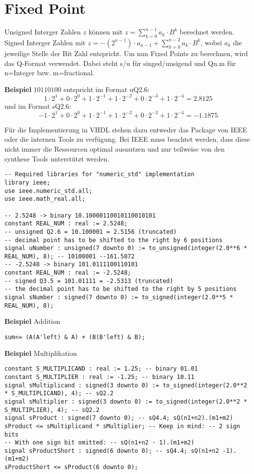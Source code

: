 \section{Fixed Point}
Unsigned Interger Zahlen $z$ können mit $z=\sum_{k=0}^{n-1}a_k\cdot B^k$ berechnet werden. Signed Interger Zahlen mit $z=-(2^{n-1})\cdot a_{n-1}+\sum_{k=0}^{n-2}a_k\cdot B^k$, wobei $a_k$ die jeweilige Stelle der Bit Zahl entspricht. Um nun Fixed Points zu berechnen, wird das Q-Format verwendet. Dabei steht s/u für singed/unsigend und Qn.m für n=Integer bzw. m=fractional.

\textbf{Beispiel} $10110100$ entspricht im Format uQ2.6:
\[
1\cdot 2^1 + 0\cdot2^0 + 1\cdot2^{-1}+ 1\cdot2^{-2}+ 0\cdot2^{-3}+ 1\cdot2^{-4} = 2.8125
\]
und im Format sQ2.6:
\[
-1\cdot 2^1 + 0\cdot2^0 + 1\cdot2^{-1}+ 1\cdot2^{-2}+ 0\cdot2^{-3}+ 1\cdot2^{-4} = -1.1875
\]

Für die Implementierung in VHDL stehen dazu entweder das Package von IEEE oder die internen Tools zu verfügung. Bei IEEE muss beachtet werden, dass diese nicht immer die Ressourcen optimal ausnutzen und nur teilweise von den synthese Tools unterstützt werden.

\begin{lstlisting}
-- Required libraries for "numeric_std" implementation
library ieee;
use ieee.numeric_std.all;
use ieee.math_real.all;

-- 2.5248 -> binary 10.10000110010110010101
constant REAL_NUM : real := 2.5248;
-- unsigned Q2.6 = 10.100001 = 2.5156 (truncated)
-- decimal point has to be shifted to the right by 6 positions
signal uNumber : unsigned(7 downto 0) := to_unsigned(integer(2.0**6 * REAL_NUM), 8); -- 10100001 --161.5872
-- -2.5248 -> binary 101.0111100110101
constant REAL_NUM : real := -2.5248;
-- signed Q3.5 = 101.01111 = -2.5313 (truncated)
-- the decimal point has to be shifted to the right by 5 positions
signal sNumber : signed(7 downto 0) := to_signed(integer(2.0**5 * REAL_NUM), 8);
\end{lstlisting}
\vspace{-20pt}

\textbf{Beispiel} Addition
\begin{lstlisting}
sum<= (A(A'left) & A) + (B(B'left) & B);
\end{lstlisting}
\vspace{-20pt}



\textbf{Beispiel} Multiplikation
\begin{lstlisting}
constant S_MULTIPLICAND : real := 1.25; -- binary 01.01
constant S_MULTIPLIER : real := -1.25; -- binary 10.11
signal sMultiplicand : signed(3 downto 0) := to_signed(integer(2.0**2 * S_MULTIPLICAND), 4); -- sQ2.2
signal sMultiplier : signed(3 downto 0) := to_signed(integer(2.0**2 * S_MULTIPLIER), 4); -- sQ2.2
signal sProduct : signed(7 downto 0); -- sQ4.4; sQ(n1+n2).(m1+m2)
sProduct <= sMultiplicand * sMultiplier; -- Keep in mind: -- 2 sign bits
-- With one sign bit omitted: -- sQ(n1+n2 - 1).(m1+m2)
signal sProductShort : signed(6 downto 0); -- sQ4.4; sQ(n1+n2 -1).(m1+m2)
sProductShort <= sProduct(6 downto 0);
\end{lstlisting}
\vspace{-20pt}


